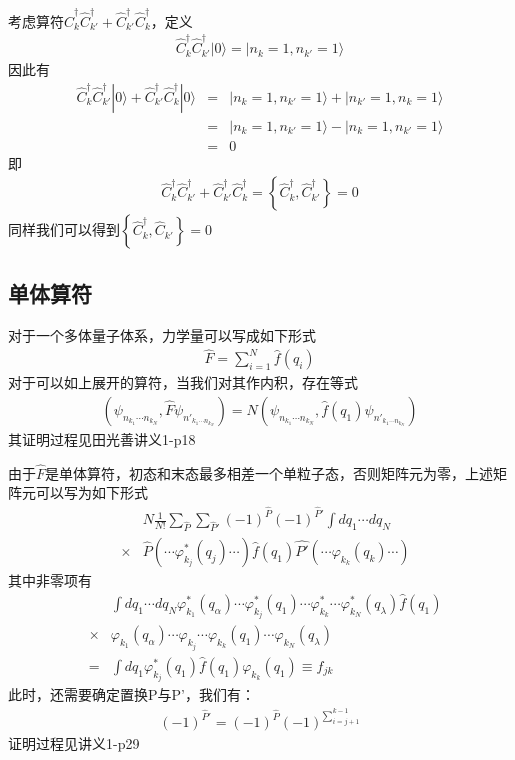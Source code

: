 \documentclass[12pt, a4paper, oneside, UTF8]{ctexbook}
\begin{document}
考虑算符$\hat{C}_k^\dag\hat{C}_{k'}^\dag+\hat{C}_{k'}^\dag\hat{C}_k^\dag$，定义
\begin{eqnarray}
    \hat{C}_k^\dag\hat{C}_{k'}^\dag|0\rangle=|n_k=1,n_{k'}=1\rangle
\end{eqnarray}
因此有
\begin{eqnarray}
    \hat{C}_k^\dag\hat{C}_{k'}^\dag|0\rangle+\hat{C}_{k'}^\dag\hat{C}_{k}^\dag|0\rangle&=&|n_k=1,n_{k'}=1\rangle+|n_{k'}=1,n_k=1\rangle\\\nonumber
    &=&|n_k=1,n_{k'}=1\rangle-|n_k=1,n_{k'}=1\rangle\\\nonumber
    &=&0
\end{eqnarray}
即
\begin{eqnarray}
    \hat{C}_k^\dag\hat{C}_{k'}^\dag+\hat{C}_{k'}^\dag\hat{C}_k^\dag=\left\{\hat{C}_k^\dag,\hat{C}_{k'}^\dag\right\}=0
\end{eqnarray}
同样我们可以得到$\left\{\hat{C}_k^\dag,\hat{C}_{k'}\right\}=0$
\subsection{单体算符}
对于一个多体量子体系，力学量可以写成如下形式
\begin{eqnarray}
    \hat{F}=\sum_{i=1}^{N}\hat{f}(q_i)
\end{eqnarray}
对于可以如上展开的算符，当我们对其作内积，存在等式
\begin{eqnarray}
    (\psi_{n_{k_1}\cdots n_{k_N}},\hat{F}\psi_{n'_{k_1\cdots n_{k_N}}})=N(\psi_{n_{k_1}\cdots n_{k_N}},\hat{f}(q_1)\psi_{n'_{k_1\cdots n_{k_N}}})
\end{eqnarray}
其证明过程见田光善讲义1-p18

由于$\hat{F}$是单体算符，初态和末态最多相差一个单粒子态，否则矩阵元为零，上述矩阵元可以写为如下形式
\begin{eqnarray}
    &&N \frac{1}{N!}\sum_{\hat{P}}\sum_{\hat{P}'}(-1)^{\hat{P}} (-1)^{\hat{P}'}\int dq_1\cdots dq_N \\\nonumber
    &\times& \hat{P}(\cdots\varphi^*_{k_j}(q_j)\cdots)\hat{f}(q_1)\hat{P'}(\cdots\varphi_{k_k}(q_k)\cdots)
\end{eqnarray}
其中非零项有
\begin{eqnarray}
    &&\int dq_1\cdots dq_N \varphi^*_{k_1}(q_\alpha)\cdots\varphi^*_{k_j}(q_1)\cdots\boxed{\varphi^*_{k_k}}\cdots \varphi^*_{k_N}(q_\lambda)\hat{f}(q_1)\\\nonumber
    &\times&\varphi_{k_1}(q_\alpha)\cdots\boxed{\varphi_{k_j}}\cdots\varphi_{k_k}(q_1)\cdots\varphi_{k_N}(q_\lambda)\\\nonumber
    &=&\int dq_1\varphi^*_{k_j}(q_1)\hat{f}(q_1)\varphi_{k_k}(q_1)\equiv f_{jk}
\end{eqnarray}
此时，还需要确定置换P与P'，我们有：
\begin{eqnarray}
    (-1)^{\hat{P}'}=(-1)^{\hat{P}}(-1)^{\sum_{i=j+1}^{k-1}}
\end{eqnarray}
证明过程见讲义1-p29
\end{document}
